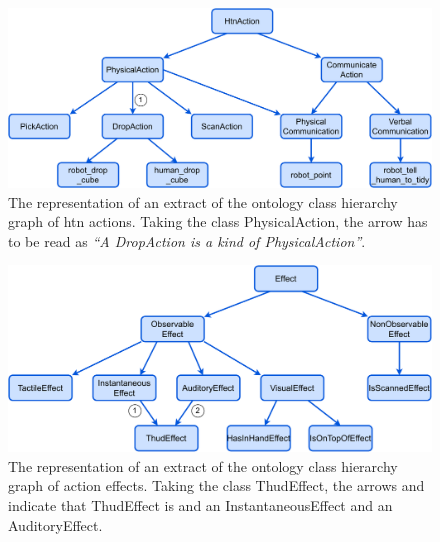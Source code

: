 \documentclass[a4paper,11pt,twoside]{StyleThese}
\begin{document}
\begin{figure}[!ht]
	\includegraphics[width=\linewidth]{figures/chapter2/class_actions.pdf}
	\caption{The representation of an extract of the ontology class hierarchy graph of \acrshort{htn} actions. Taking the class PhysicalAction, the arrow  has to be read	as \textit{``A DropAction is a kind of PhysicalAction''}.}
	\label{chap2:fig:class_actions}
\end{figure}

\begin{figure}[!ht]
	\includegraphics[width=\linewidth]{figures/chapter2/class_effects.pdf}
	\caption{The representation of an extract of the ontology class hierarchy graph of action effects. Taking the class ThudEffect, the arrows  and  indicate that ThudEffect is and an InstantaneousEffect and an AuditoryEffect.}
	\label{chap2:fig:class_effects}
\end{figure}
\end{document}
